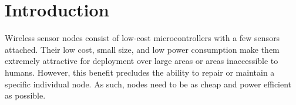 \section{Introduction}

Wireless sensor nodes consist of low-cost microcontrollers with a few sensors attached. Their low cost, small size, and low power consumption make them extremely attractive for deployment over large areas or areas inaccessible to humans. However, this benefit precludes the ability to repair or maintain a specific individual node. As such, nodes need to be as cheap and power efficient as possible.